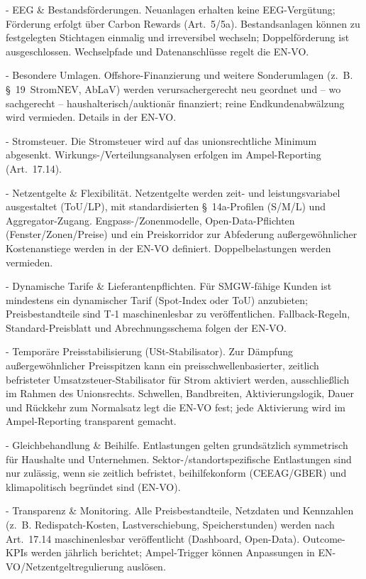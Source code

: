 \documentclass[12pt,a4paper]{scrartcl}
\begin{document}
- EEG \& Bestandsförderungen. Neuanlagen erhalten keine EEG-Vergütung; Förderung erfolgt über Carbon Rewards (Art. 5/5a). Bestandsanlagen können zu festgelegten Stichtagen einmalig und irreversibel wechseln; Doppelförderung ist ausgeschlossen. Wechselpfade und Datenanschlüsse regelt die EN-VO.

- Besondere Umlagen. Offshore-Finanzierung und weitere Sonderumlagen (z. B. § 19 StromNEV, AbLaV) werden verursachergerecht neu geordnet und -- wo sachgerecht -- haushalterisch/auktionär finanziert; reine Endkundenabwälzung wird vermieden. Details in der EN-VO.

- Stromsteuer. Die Stromsteuer wird auf das unionsrechtliche Minimum abgesenkt. Wirkungs-/Verteilungsanalysen erfolgen im Ampel-Reporting (Art. 17.14).

- Netzentgelte \& Flexibilität. Netzentgelte werden zeit- und leistungsvariabel ausgestaltet (ToU/LP), mit standardisierten § 14a-Profilen (S/M/L) und Aggregator-Zugang. Engpass-/Zonenmodelle, Open-Data-Pflichten (Fenster/Zonen/Preise) und ein Preiskorridor zur Abfederung außergewöhnlicher Kostenanstiege werden in der EN-VO definiert. Doppelbelastungen werden vermieden.

- Dynamische Tarife \& Lieferantenpflichten. Für SMGW-fähige Kunden ist mindestens ein dynamischer Tarif (Spot-Index oder ToU) anzubieten; Preisbestandteile sind T-1 maschinenlesbar zu veröffentlichen. Fallback-Regeln, Standard-Preisblatt und Abrechnungsschema folgen der EN-VO.

- Temporäre Preisstabilisierung (USt-Stabilisator). Zur Dämpfung außergewöhnlicher Preisspitzen kann ein preisschwellenbasierter, zeitlich befristeter Umsatzsteuer-Stabilisator für Strom aktiviert werden, ausschließlich im Rahmen des Unionsrechts. Schwellen, Bandbreiten, Aktivierungslogik, Dauer und Rückkehr zum Normalsatz legt die EN-VO fest; jede Aktivierung wird im Ampel-Reporting transparent gemacht.

- Gleichbehandlung \& Beihilfe. Entlastungen gelten grundsätzlich symmetrisch für Haushalte und Unternehmen. Sektor-/standortspezifische Entlastungen sind nur zulässig, wenn sie zeitlich befristet, beihilfekonform (CEEAG/GBER) und klimapolitisch begründet sind (EN-VO).

- Transparenz \& Monitoring. Alle Preisbestandteile, Netzdaten und Kennzahlen (z. B. Redispatch-Kosten, Lastverschiebung, Speicherstunden) werden nach Art. 17.14 maschinenlesbar veröffentlicht (Dashboard, Open-Data). Outcome-KPIs werden jährlich berichtet; Ampel-Trigger können Anpassungen in EN-VO/Netzentgeltregulierung auslösen.
\end{document}
